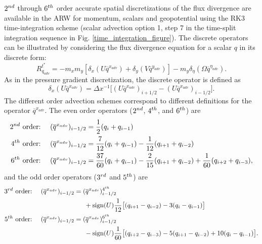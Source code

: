 $\hbox{2}^{nd}$ through $\hbox{6}^{th}$ order accurate spatial 
discretizations
of the flux divergence are available in the ARW for momentum,
scalars and geopotential using the RK3 time-integration scheme
(scalar advection option 1, step 7 in the time-split integration sequence
in Fig. \ref{time_integration_figure}).
The discrete operators can be illustrated
by considering the flux divergence equation for
a scalar $q$ in its discrete form:
%
\begin{equation}
R_{q_{adv}}^{t^*} =
- m_x m_y [\delta_x (U \overline{q}^{x_{adv}}) 
+ \delta_y (V\overline{q}^{y_{adv}})] 
- m_y \delta_\eta
(\Omega \overline{q}^{\eta_{adv}}).
\label{flux-divergence}
\end{equation}
%
As in the pressure gradient discretization, the discrete operator
is defined as
%
\begin{equation}
\delta_x (U \overline{q}^{x_{adv}}) = \Delta x^{-1} 
\bigl[ (U \overline{q}^{x_{adv}})_{i+1/2} -
(U \overline{q}^{x_{adv}})_{i-1/2} \bigr].
\label{discrete-divergence}
\end{equation}
%
\noindent
The different order advection schemes correspond to different
definitions for the operator  $\overline{q}^{x_{adv}}$.  
The even order operators 
($\hbox{2}^{nd}$, $\hbox{4}^{th}$, and $\hbox{6}^{th}$) are
%
\begin{align}
\hbox{2}^{nd} \hbox{ order:} ~~~~ & 
(\overline{q}^{x_{adv}})_{i-1/2} = 
{1 \over 2} 
(q_{i} + q_{i-1}) \notag \\
%
\hbox{4}^{th} \hbox{ order:} ~~~~ & 
(\overline{q}^{x_{adv}})_{i-1/2} = 
{7 \over 12} (q_{i} + q_{i-1}) 
- {1 \over 12} (q_{i+1} + q_{i-2}) 
\notag \\
\hbox{6}^{th} \hbox{ order:} ~~~~ & 
(\overline{q}^{x_{adv}})_{i-1/2} = 
{37 \over 60} (q_{i} + q_{i-1}) 
- {2 \over 15} (q_{i+1} + q_{i-2}) 
+ {1 \over 60} (q_{i+2} + q_{i-3}),
\notag
\end{align}
%
\noindent
and the odd order operators ($\hbox{3}^{rd}$ and $\hbox{5}^{th}$) are
%
\begin{align}
\hbox{3}^{rd} \hbox{ order:} ~~~~ & 
(\overline{q}^{x_{adv}})_{i-1/2} = 
(\overline{q}^{x_{adv}})_{i-1/2}^{4^{th}} 
\notag
\\
&~~~~~~~~~~~~~~~~~~~~
+ \hbox{sign}(U){1 \over 12} \bigl[
(q_{i+1}-q_{i-2}) - 3(q_i - q_{i-1}) \bigr]
\notag
\\
\hbox{5}^{th} \hbox{ order:} ~~~~ & 
(\overline{q}^{x_{adv}})_{i-1/2} = 
(\overline{q}^{x_{adv}})_{i-1/2}^{6^{th}} 
\notag
\\
&~~~~~~~~~~~~~~~~~~~~
- \hbox{sign}(U){1 \over 60} \bigl[
(q_{i+2}-q_{i-3}) - 5(q_{i+1} - q_{i-2}) 
+ 10(q_i - q_{i-1})
\bigr].
\notag
\end{align}

